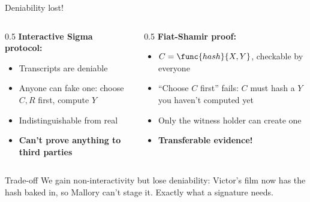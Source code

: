 \ifdefined\PRESENTATION\else\PassOptionsToClass{handout}{beamer}\fi\documentclass[aspectratio=169, lualatex]{beamer}
\begin{document}
\begin{frame}{Deniability lost!}
	\begin{columns}[c]
		\begin{column}{0.5\textwidth}
			\textbf{Interactive Sigma protocol:}
			\begin{itemize}
				\item Transcripts are deniable
				\item Anyone can fake one: choose $C, R$ first, compute $Y$
				\item Indistinguishable from real
				\item \textbf{Can't prove anything to third parties}
			\end{itemize}
		\end{column}
		\begin{column}{0.5\textwidth}
			\textbf{Fiat-Shamir proof:}
			\begin{itemize}
				\item $C = \func{hash}{X, Y}$, checkable by everyone
				\item ``Choose $C$ first'' fails: $C$ must hash a $Y$ you haven't computed yet
				\item Only the witness holder can create one
				\item \textbf{Transferable evidence!}
			\end{itemize}
		\end{column}
	\end{columns}
	\begin{alertblock}{Trade-off}
		We gain non-interactivity but lose deniability: Victor's film now has the hash baked in, so Mallory can't stage it. Exactly what a signature needs.
	\end{alertblock}
\end{frame}
\end{document}
